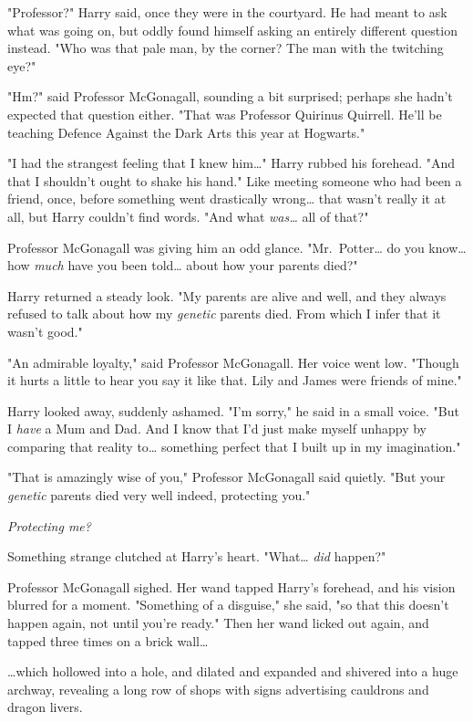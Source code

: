 "Professor?" Harry said, once they were in the courtyard. He had meant to ask
what was going on, but oddly found himself asking an entirely different
question instead. "Who was that pale man, by the corner? The man with the
twitching eye?"

"Hm?" said Professor McGonagall, sounding a bit surprised; perhaps she hadn't
expected that question either. "That was Professor Quirinus Quirrell. He'll be
teaching Defence Against the Dark Arts this year at Hogwarts."

"I had the strangest feeling that I knew him{\ldots}" Harry rubbed his
forehead. "And that I shouldn't ought to shake his hand." Like meeting someone
who had been a friend, once, before something went drastically wrong{\ldots}
that wasn't really it at all, but Harry couldn't find words. "And what
\emph{was{\ldots}} all of that?"

Professor McGonagall was giving him an odd glance. "Mr.~Potter{\ldots} do you
know{\ldots} how \emph{much} have you been told{\ldots} about how your parents
died?"

Harry returned a steady look. "My parents are alive and well, and they always
refused to talk about how my \emph{genetic} parents died. From which I infer
that it wasn't good."

"An admirable loyalty," said Professor McGonagall. Her voice went low. "Though
it hurts a little to hear you say it like that. Lily and James were friends of
mine."

Harry looked away, suddenly ashamed. "I'm sorry," he said in a small voice.
"But I \emph{have} a Mum and Dad. And I know that I'd just make myself unhappy
by comparing that reality to{\ldots} something perfect that I built up in my
imagination."

"That is amazingly wise of you," Professor McGonagall said quietly. "But your
\emph{genetic} parents died very well indeed, protecting you."

\emph{Protecting me?}

Something strange clutched at Harry's heart. "What{\ldots} \emph{did} happen?"

Professor McGonagall sighed. Her wand tapped Harry's forehead, and his vision
blurred for a moment. "Something of a disguise," she said, "so that this
doesn't happen again, not until you're ready." Then her wand licked out again,
and tapped three times on a brick wall{\ldots}

{\ldots}which hollowed into a hole, and dilated and expanded and shivered into
a huge archway, revealing a long row of shops with signs advertising cauldrons
and dragon livers.

